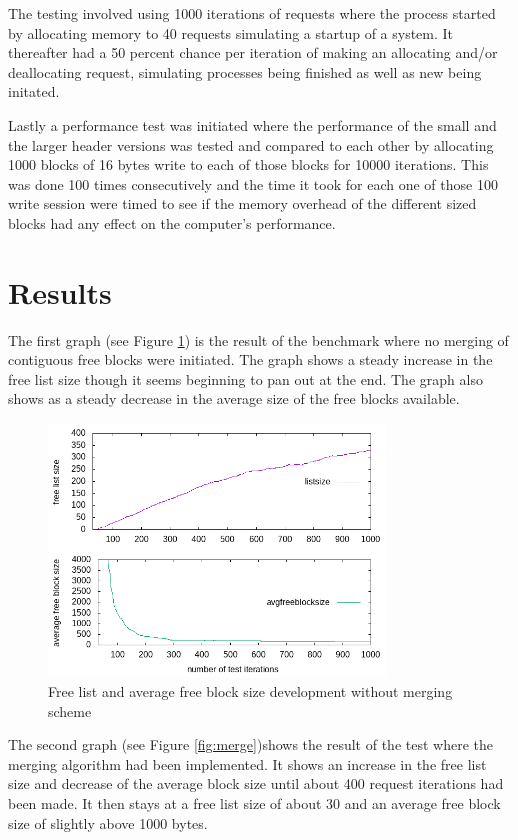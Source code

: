 \documentclass{article}
\begin{document}
The testing involved using 1000 iterations of requests where the process started by allocating memory to 40 requests simulating a startup of 
a system. It thereafter had a 50 percent chance per iteration of making an allocating and/or deallocating request, simulating processes being 
finished as well as new being initated. 

Lastly a performance test was initiated where the performance of the small and the larger header versions was tested and compared to each other 
by allocating 1000 blocks of 16 bytes write to each of those blocks for 10000 iterations. This was done 100 times 
consecutively and the time it took for each one of those 100 write session were timed to see if the memory overhead 
of the different sized blocks had any effect on the computer’s performance.   


\section{Results}\label{results}
The first graph (see Figure \ref{fig:basic}) is the result of the benchmark where no 
merging of contiguous free blocks were initiated. The graph shows a steady increase in the free list size though it seems beginning to 
pan out at the end. The graph also shows as a steady decrease in the average size of the free blocks available. 


\begin{figure}[h!]
    \centering
    \includegraphics[width=0.8\textwidth]{basic.png}
    \caption{Free list and average free block size development without merging scheme}
    \label{fig:basic}
\end{figure}
\newpage

The second graph (see Figure \ref{fig:merge})shows the result of the test where the merging algorithm had been implemented. It shows an increase 
in the free list size and decrease of the average block size until about 400 request iterations had been made. It then stays at a free 
list size of about 30 and an average free block size of slightly above 1000 bytes. 
\end{document}
